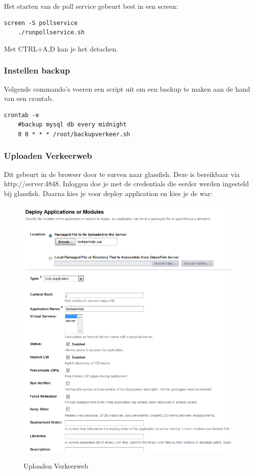 Het starten van de poll service gebeurt best in een screen:

\begin{lstlisting}[style=BashInputStyle]
	screen -S pollservice
	./runpollservice.sh
\end{lstlisting}

Met CTRL+A,D kan je het detachen.

\subsubsection{Instellen backup}

Volgende commando's voeren een script uit om een backup te maken aan de hand van een crontab.

\begin{lstlisting}[style=BashInputStyle]
	crontab -e
	#backup mysql db every midnight
	0 0 * * * /root/backupverkeer.sh
\end{lstlisting}

\subsubsection{Uploaden Verkeerweb}

Dit gebeurt in de browser door te surven naar glassfish. Deze is bereikbaar via http://server:4848. Inloggen doe je met de credentials die eerder werden ingesteld bij glassfish. Daarna kies je voor deploy application en kies je de war:

\begin{figure}[H]
\centering
\includegraphics[width=\textwidth]{images/uploadverkeerweb.png}\\
\caption{Uploaden Verkeerweb}
\end{figure}